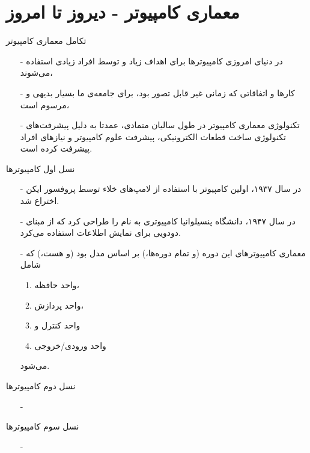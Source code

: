 \section{معماری کامپیوتر - دیروز تا امروز}
\begin{frame}{تکامل معماری کامپیوتر}
\begin{itemize}\itemr
\item[-]
در دنیای امروزی کامپیوتر‌ها برای اهداف زیاد و توسط افراد زیادی استفاده می‌شوند،
\item[-]
کارها و اتفاقاتی که زمانی غیر قابل تصور بود، برای جامعه‌ی ما بسیار بدیهی و مرسوم است،
\item[-]
تکنولوژی معماری‌ کامپیوتر در طول سالیان متمادی، عمدتا به دلیل پیشرفت‌های تکنولوژی ساخت قطعات الکترونیکی، پیشرفت علوم کامپیوتر و نیاز‌‌های افراد پیشرفت کرده است.
\end{itemize}
\end{frame}

\begin{frame}{نسل اول کامپیوتر‌ها}
\begin{itemize}\itemr
\item[-]
در سال ۱۹۳۷، اولین کامپیوتر با استفاده از لامپ‌های خلاء توسط پروفسور ایکن اختراع شد.
\item[-]
در سال ۱۹۴۷، دانشگاه پنسیلوانیا کامپیوتری به نام 
را طراحی کرد که از مبنای دودویی برای نمایش اطلاعات استفاده می‌کرد.
\item[-]
معماری کامپیوتر‌های این دوره (و تمام دوره‌ها،) بر اساس مدل 
بود (و هست،) که شامل 
\begin{enumerate}\itemr
\item 
واحد‌ حافظه،
\item 
واحد پردازش، 
\item 
واحد کنترل و
\item 
واحد ورودی/خروجی 
\end{enumerate}
می‌شود.
\end{itemize}
\end{frame}

\begin{frame}{نسل دوم کامپیوتر‌ها}
\begin{itemize}\itemr
\item[-]
\end{itemize}
\end{frame}

\begin{frame}{نسل سوم کامپیوتر‌ها}
\begin{itemize}\itemr
\item[-]
\end{itemize}
\end{frame}

